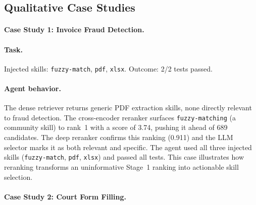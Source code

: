 \documentclass[11pt]{article}
\begin{document}
\begin{table}[t]
  \centering
  \caption{Excluded benchmark tasks.
  Of 87 SkillsBench tasks, 22 are excluded (65 retained).
  Of 89 Terminal-Bench tasks, 1 is excluded (88 retained).}
  \label{tab:excluded_tasks}
  
\end{table}

\subsection{Qualitative Case Studies}
\label{sec:case_studies}

\paragraph{Case Study 1: Invoice Fraud Detection.}
\label{sec:case_study_1}

\paragraph{Task.}
Injected skills: \texttt{fuzzy-match}, \texttt{pdf}, \texttt{xlsx}.
Outcome: 2/2 tests passed.

\begin{table}[t]
  \centering
  \caption{Pipeline progression for \texttt{invoice-fraud-detection}.}
  \label{tab:case_study_1}
  
\end{table}

\paragraph{Agent behavior.}
The dense retriever returns generic PDF extraction skills, none directly relevant to fraud detection.
The cross-encoder reranker surfaces \texttt{fuzzy-matching} (a community skill) to rank~1 with a score of 3.74, pushing it ahead of 689 candidates.
The deep reranker confirms this ranking (0.911) and the LLM selector marks it as both relevant and specific.
The agent used all three injected skills (\texttt{fuzzy-match}, \texttt{pdf}, \texttt{xlsx}) and passed all tests.
This case illustrates how reranking transforms an uninformative Stage~1 ranking into actionable skill selection.

\paragraph{Case Study 2: Court Form Filling.}
\label{sec:case_study_2}
\end{document}
